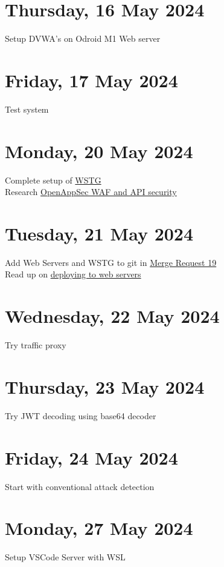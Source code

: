 \section[2024/05/16]{Thursday, 16 May 2024}
Setup DVWA's on Odroid M1 Web server
\pendsign

\section[2024/05/17]{Friday, 17 May 2024}
Test system
\pendsign

\section[2024/05/20]{Monday, 20 May 2024}
Complete setup of \href{https://owasp.org/www-project-web-security-testing-guide/v42/}{WSTG}\\
Research \href{https://www.openappsec.io/}{OpenAppSec WAF and API security}\\
\pendsign

\section[2024/05/21]{Tuesday, 21 May 2024}
Add Web Servers and WSTG to git in \href{https://repo.ee.up.ac.za/eece_ugfyp_tg/2024_isg/tg4-koot-u20426471/-/merge_requests/19}{Merge Request 19}\\
Read up on \href{https://stackoverflow.com/questions/57948640/can-you-use-git-to-deploy-code-to-a-fleet-of-devices}{deploying to web servers}\\
\pendsign

\section[2024/05/22]{Wednesday, 22 May 2024}
Try traffic proxy
\pendsign

\section[2024/05/23]{Thursday, 23 May 2024}
Try JWT decoding using base64 decoder
\pendsign

\section[2024/05/24]{Friday, 24 May 2024}
Start with conventional attack detection
\pendsign

\section[2024/05/27]{Monday, 27 May 2024}
Setup VSCode Server with WSL
\pendsign


